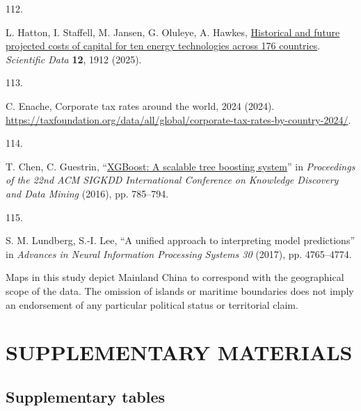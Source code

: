 \documentclass[
  letterpaper,
]{article}
\newlength{\cslhangindent}
\newlength{\csllabelwidth}
\newenvironment{CSLReferences}[2] %
 {\begin{list}{}{%
  \setlength{\itemindent}{0pt}
  \setlength{\leftmargin}{0pt}
  \setlength{\parsep}{0pt}
  \ifodd #1
   \setlength{\leftmargin}{\cslhangindent}
   \setlength{\itemindent}{-1\cslhangindent}
  \fi
  \setlength{\itemsep}{#2\baselineskip}}}
 {\end{list}}
\newcommand{\CSLLeftMargin}[1]{\parbox[t]{\csllabelwidth}{\strut#1\strut}}
\newcommand{\CSLRightInline}[1]{\parbox[t]{\linewidth - \csllabelwidth}{\strut#1\strut}}
\begin{document}
\begin{CSLReferences}{0}{1}
\CSLLeftMargin{112. }%
\CSLRightInline{L. Hatton, I. Staffell, M. Jansen, G. Oluleye, A.
Hawkes, \href{https://doi.org/10.1038/s41597-025-06177-0}{Historical and
future projected costs of capital for ten energy technologies across 176
countries}. \emph{Scientific Data} \textbf{12}, 1912 (2025).}

\CSLLeftMargin{113. }%
\CSLRightInline{C. Enache, Corporate tax rates around the world, 2024
(2024).
\url{https://taxfoundation.org/data/all/global/corporate-tax-rates-by-country-2024/}.}

\CSLLeftMargin{114. }%
\CSLRightInline{T. Chen, C. Guestrin,
{``\href{https://doi.org/10.1145/2939672.2939785}{{XGBoost}: A scalable
tree boosting system}''} in \emph{Proceedings of the 22nd ACM SIGKDD
International Conference on Knowledge Discovery and Data Mining} (2016),
pp. 785--794.}

\CSLLeftMargin{115. }%
\CSLRightInline{S. M. Lundberg, S.-I. Lee, {``A unified approach to
interpreting model predictions''} in \emph{Advances in Neural
Information Processing Systems 30} (2017), pp. 4765--4774.}

\end{CSLReferences}

Maps in this study depict Mainland China to correspond with the
geographical scope of the data. The omission of islands or maritime
boundaries does not imply an endorsement of any particular political
status or territorial claim.

\section*{SUPPLEMENTARY MATERIALS}\label{supplementary-materials}

\clearpage
\setcounter{figure}{0}
\renewcommand{\thefigure}{S\arabic{figure}}
\setcounter{table}{0}
\renewcommand{\thetable}{S\arabic{table}}

\subsection*{Supplementary tables}\label{supplementary-tables}

\begingroup\fontsize{7}{9}\selectfont
\end{document}
